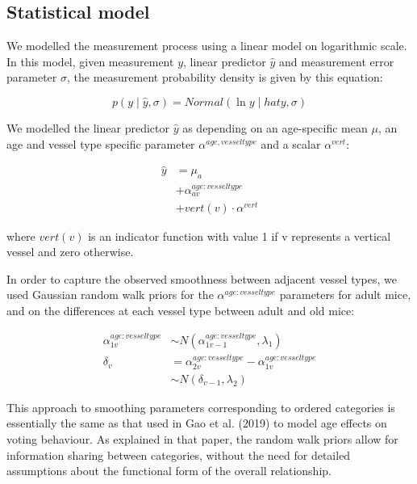 \documentclass[
  letterpaper,
  DIV=11,
  numbers=noendperiod,
  oneside]{scrartcl}
\theoremstyle{plain}
\theoremstyle{remark}
\begin{document}
\subsection{Statistical model}\label{statistical-model-1}

We modelled the measurement process using a linear model on logarithmic
scale. In this model, given measurement \(y\), linear predictor
\(\hat{y}\) and measurement error parameter \(\sigma\), the measurement
probability density is given by this equation:

\begin{equation}
  p(y\mid\hat{y}, \sigma) = Normal(\ln{y}\mid hat{y}, \sigma) \label{eq:measurement-model-density}
\end{equation}

We modelled the linear predictor \(\hat{y}\) as depending on an
age-specific mean \(\mu\), an age and vessel type specific parameter
\(\alpha^{age,vessel type}\) and a scalar \(\alpha^{vert}\):

\begin{align}
  \hat{y} &= \mu_a \label{eq:density-measurement-model} \\
          &+ \alpha^{age:vesseltype}_{av} \nonumber \\ 
          &+ vert(v) \cdot \alpha^{vert} \nonumber
\end{align}

where \(vert(v)\) is an indicator function with value 1 if v represents
a vertical vessel and zero otherwise.

In order to capture the observed smoothness between adjacent vessel
types, we used Gaussian random walk priors for the
\(\alpha^{age:vesseltype}\) parameters for adult mice, and on the
differences at each vessel type between adult and old mice:

\begin{align}
  \alpha^{age:vesseltype}_{1v} &\sim N(\alpha^{age:vesseltype}_{1v-1}, \lambda_1)\label{eq:smooth} \\
  \delta_v &= \alpha^{age:vesseltype}_{2v} - \alpha^{age:vesseltype}_{1v} \nonumber \\
         &\sim N(\delta_{v-1}, \lambda_2) \nonumber
\end{align}

This approach to smoothing parameters corresponding to ordered
categories is essentially the same as that used in Gao et al. (2019) to
model age effects on voting behaviour. As explained in that paper, the
random walk priors allow for information sharing between categories,
without the need for detailed assumptions about the functional form of
the overall relationship.
\end{document}
